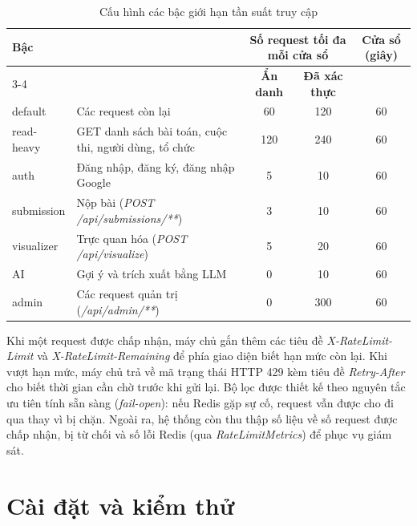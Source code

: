 \documentclass[12pt, a4paper]{report}
\begin{document}
\begin{table}[H]
  \centering
  \begin{tabular}{|l|>{\raggedright\arraybackslash}p{5.2cm}|c|c|c|}
    \hline
    \multirow{2}{*}{\textbf{Bậc}} & \multirow{2}{*}{\textbf{Phạm vi áp dụng}}
      & \multicolumn{2}{c|}{\textbf{Số request tối đa mỗi cửa sổ}}
      & \multirow{2}{*}{\textbf{Cửa sổ (giây)}} \\
    \cline{3-4}
    & & \textbf{Ẩn danh} & \textbf{Đã xác thực} & \\
    \hline
    default & Các request còn lại & 60 & 120 & 60 \\
    \hline
    read-heavy & GET danh sách bài toán, cuộc thi, người dùng, tổ chức & 120 & 240 & 60 \\
    \hline
    auth & Đăng nhập, đăng ký, đăng nhập Google & 5 & 10 & 60 \\
    \hline
    submission & Nộp bài (\textit{POST /api/submissions/**}) & 3 & 10 & 60 \\
    \hline
    visualizer & Trực quan hóa (\textit{POST /api/visualize}) & 5 & 20 & 60 \\
    \hline
    AI & Gợi ý và trích xuất bằng \ac{LLM} & 0 & 10 & 60 \\
    \hline
    admin & Các request quản trị (\textit{/api/admin/**}) & 0 & 300 & 60 \\
    \hline
  \end{tabular}
  \caption{Cấu hình các bậc giới hạn tần suất truy cập}\label{tab:ratelimit-tiers}
\end{table}

Khi một request được chấp nhận, máy chủ gắn thêm các tiêu đề \textit{X-RateLimit-Limit} và
\textit{X-RateLimit-Remaining} để phía giao diện biết hạn mức còn lại. Khi vượt hạn mức, máy
chủ trả về mã trạng thái \ac{HTTP} 429 kèm tiêu đề \textit{Retry-After} cho biết thời gian cần
chờ trước khi gửi lại. Bộ lọc được thiết kế theo nguyên tắc ưu tiên tính sẵn sàng
(\emph{fail-open}): nếu Redis gặp sự cố, request vẫn được cho đi qua thay vì bị chặn. Ngoài ra,
hệ thống còn thu thập số liệu về số request được chấp nhận, bị từ chối và số lỗi Redis (qua
\textit{RateLimitMetrics}) để phục vụ giám sát.

\chapter{Cài đặt và kiểm thử}
\end{document}
